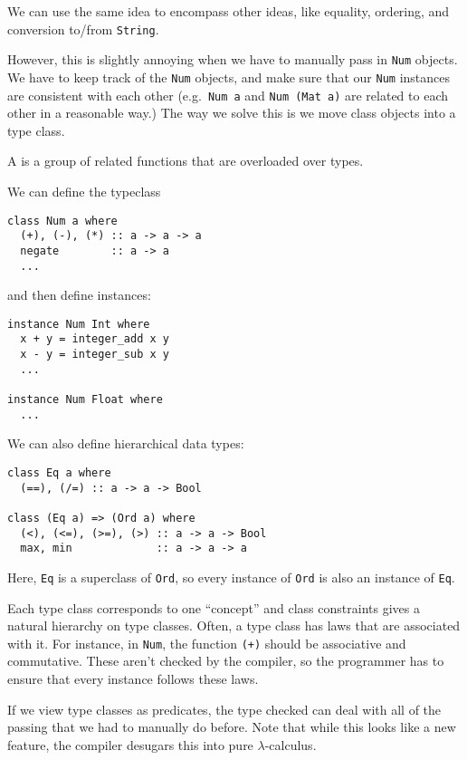 \documentclass[class=scrartcl]{standalone}
\begin{document}
We can use the same idea to encompass other ideas,
like equality, ordering, and conversion to/from \texttt{String}.

However, this is slightly annoying when
we have to manually pass in \texttt{Num} objects.
We have to keep track of the \texttt{Num} objects,
and make sure that our \texttt{Num}
instances are consistent with each other
(e.g.\ \texttt{Num a} and \texttt{Num (Mat a)}
 are related to each other in a reasonable way.)
The way we solve this is we move class objects into a type class.

\begin{definition}
  A  is a group of related functions
  that are overloaded over types.
\end{definition}

We can define the typeclass
\begin{verbatim}
class Num a where
  (+), (-), (*) :: a -> a -> a
  negate        :: a -> a
  ...
\end{verbatim}
and then define instances:
\begin{verbatim}
instance Num Int where
  x + y = integer_add x y
  x - y = integer_sub x y
  ...

instance Num Float where
  ...
\end{verbatim}

We can also define hierarchical data types:
\begin{verbatim}
class Eq a where
  (==), (/=) :: a -> a -> Bool

class (Eq a) => (Ord a) where
  (<), (<=), (>=), (>) :: a -> a -> Bool
  max, min             :: a -> a -> a
\end{verbatim}
Here, \texttt{Eq} is a superclass of \texttt{Ord},
so every instance of \texttt{Ord} is
also an instance of \texttt{Eq}.

Each type class corresponds to one ``concept'' and class constraints
gives a natural hierarchy on type classes.
Often, a type class has laws that are associated with it.
For instance, in \texttt{Num},
the function \texttt{(+)} should be associative and commutative.
These aren't checked by the compiler, so the programmer has to ensure that
every instance follows these laws.

If we view type classes as predicates,
the type checked can deal with all of the passing
that we had to manually do before.
Note that while this looks like a new feature,
the compiler desugars this into pure \(\lambda\)-calculus.
\end{document}
